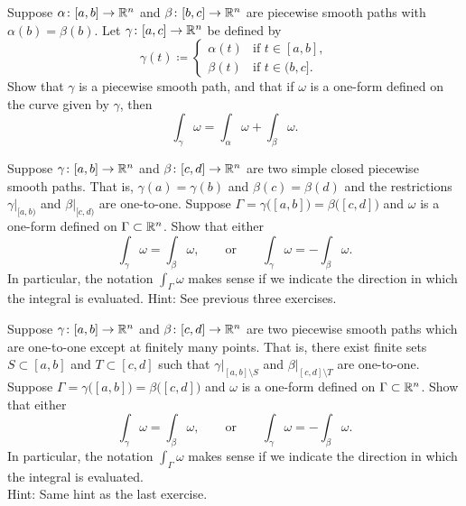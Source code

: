 \begin{exercise} 
\pagebreak[1]
Suppose $\alpha \colon [a,b] \to {\mathbb{R}}^n$ and
$\beta \colon [b,c] \to {\mathbb{R}}^n$ are piecewise smooth paths with
$\alpha(b)=\beta(b)$.  Let $\gamma \colon [a,c] \to {\mathbb{R}}^n$ be defined by
\begin{equation*}
\gamma(t) \coloneqq
\begin{cases}
\alpha(t) & \text{if } t \in [a,b], \\
\beta(t)  & \text{if } t \in (b,c].
\end{cases}
\end{equation*}
Show that $\gamma$ is a piecewise smooth path, and that if $\omega$ is a
one-form defined on the curve given by $\gamma$, then
\begin{equation*}
\int_{\gamma} \omega =
\int_{\alpha} \omega +
\int_{\beta} \omega .
\end{equation*}
\end{exercise}

\begin{exercise} \label{mv:exercise:closedcurveintegral}
\pagebreak[1]
Suppose $\gamma \colon [a,b] \to {\mathbb{R}}^n$ and
$\beta \colon [c,d] \to {\mathbb{R}}^n$ are two simple closed piecewise smooth paths.
That is, $\gamma(a)=\gamma(b)$ and $\beta(c) = \beta(d)$ and
the restrictions $\gamma|_{[a,b)}$ and $\beta|_{[c,d)}$ are one-to-one.
Suppose $\Gamma = \gamma\bigl([a,b]\bigr) = \beta\bigl([c,d]\bigr)$ and
$\omega$ is a one-form defined on $\Gamma \subset {\mathbb{R}}^n$.  Show that either
\begin{equation*}
\int_\gamma \omega = 
\int_\beta \omega,
\qquad \text{or} \qquad 
\int_\gamma \omega = 
- \int_\beta \omega.
\end{equation*}
In particular, the notation $\int_{\Gamma} \omega$ makes sense if we indicate
the direction in which the integral is evaluated.
Hint: See previous three exercises.
\end{exercise}

\begin{exercise} \label{mv:exercise:curveintegral}
Suppose $\gamma \colon [a,b] \to {\mathbb{R}}^n$ and
$\beta \colon [c,d] \to {\mathbb{R}}^n$ are two piecewise smooth paths
which are one-to-one except at finitely many points.  That is,
there exist finite sets $S \subset [a,b]$ and $T \subset [c,d]$
such that $\gamma|_{[a,b]\setminus S}$ and
$\beta|_{[c,d]\setminus T}$ are one-to-one.
Suppose $\Gamma = \gamma\bigl([a,b]\bigr) = \beta\bigl([c,d]\bigr)$ and $\omega$ is a
one-form defined on $\Gamma \subset {\mathbb{R}}^n$.  Show that either
\begin{equation*}
\int_\gamma \omega = 
\int_\beta \omega,
\qquad \text{or} \qquad 
\int_\gamma \omega = 
- \int_\beta \omega.
\end{equation*}
In particular, the notation $\int_{\Gamma} \omega$ makes sense if we indicate
the direction in which the integral is evaluated.
\\
Hint: Same hint as the last exercise.
\end{exercise}

